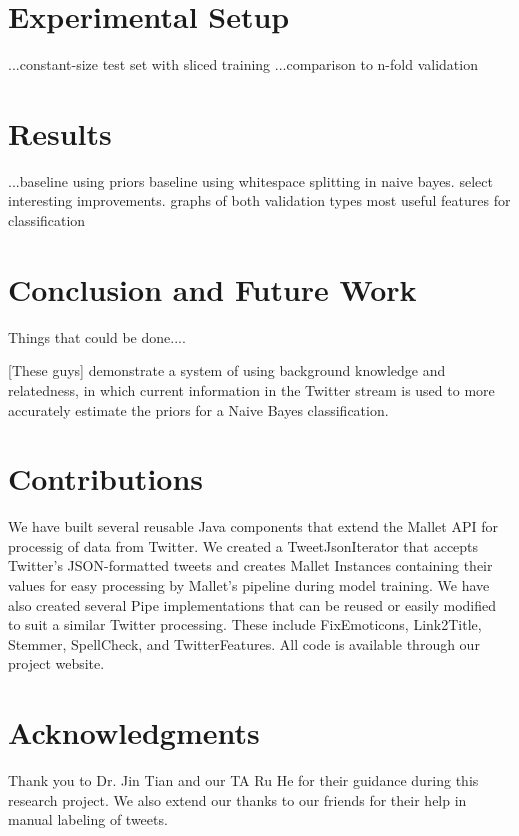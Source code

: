 \documentclass[letterpaper]{article}
\begin{document}
\section{Experimental Setup}
...constant-size test set with sliced training
...comparison to n-fold validation

\section{Results}
...baseline using priors
  baseline using whitespace splitting in naive bayes.
  select interesting improvements.
  graphs of both validation types
  most useful features for classification

\section{Conclusion and Future Work}

Things that could be done....

[These guys] demonstrate a system of using background knowledge and relatedness, in which current information in the Twitter stream is used to more accurately estimate the priors for a Naive Bayes classification.

\section{Contributions}

We have built several reusable Java components that extend the Mallet API for processig of data from Twitter. We created a TweetJsonIterator that accepts Twitter's JSON-formatted tweets and creates Mallet Instances containing their values for easy processing by Mallet's pipeline during model training. We have also created several Pipe implementations that can be reused or easily modified to suit a similar Twitter processing. These include FixEmoticons, Link2Title, Stemmer, SpellCheck, and TwitterFeatures. All code is available through our project website.

\section{ Acknowledgments}
Thank you to Dr. Jin Tian and our TA Ru He for their guidance during this research project. We also extend our thanks to our friends for their help in manual labeling of tweets.
\end{document}
